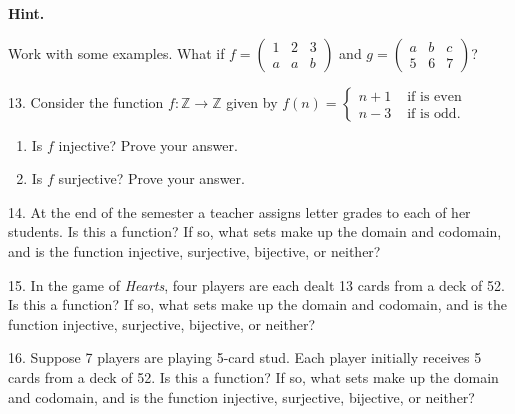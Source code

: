 \documentclass[10pt,]{book}
\theoremstyle{plain}
\theoremstyle{definition}
\numberwithin{equation}{chapter}
\def\Z{\mathbb Z}
\newcommand{\twoline}[2]{\begin{pmatrix}#1 \\ #2 \end{pmatrix}}
\newcommand{\amp}{ & }
\begin{document}
\begin{exerciselist}
\par\smallskip
\par\smallskip
\noindent\textbf{Hint.}\hypertarget{hint-3}{}\quad

            Work with some examples.  What if \(f = \twoline{1\amp 2 \amp 3}{a \amp a \amp b}\) and \(g = \twoline{a\amp b \amp c}{5 \amp 6 \amp 7}\)?
\item[13.]\hypertarget{exercise-39}{}
            Consider the function \(f:\Z \to \Z\) given by \(f(n) = \begin{cases}n+1 \amp  \mbox{ if  is even} \\ n-3 \amp \mbox{ if  is odd} . \end{cases}
            \)
          \leavevmode%
\begin{enumerate}[label=(\alph*)]
\item\hypertarget{li-178}{}
                Is \(f\) injective? Prove your answer.
\item\hypertarget{li-179}{}
                Is \(f\) surjective? Prove your answer.
\end{enumerate}

\par\smallskip
\item[14.]\hypertarget{exercise-40}{}
            At the end of the semester a teacher assigns letter grades to each of her students. Is this a function? If so, what sets make up the domain and codomain, and is the function injective, surjective, bijective, or neither?
\par\smallskip
\item[15.]\hypertarget{exercise-41}{}
            In the game of \emph{Hearts}, four players are each dealt 13 cards from a deck of 52. Is this a function? If so, what sets make up the domain and codomain, and is the function injective, surjective, bijective, or neither?
\par\smallskip
\item[16.]\hypertarget{exercise-42}{}
            Suppose 7 players are playing 5-card stud. Each player initially receives 5 cards from a deck of 52. Is this a function? If so, what sets make up the domain and codomain, and is the function injective, surjective, bijective, or neither?
\par\smallskip
\end{exerciselist}
\typeout{************************************************}
\typeout{************************************************}
\end{document}
